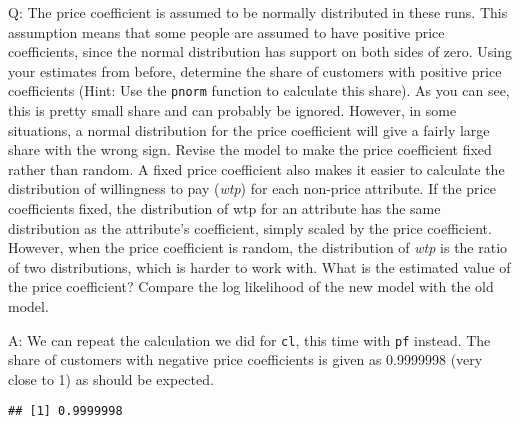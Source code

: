 \documentclass[
]{article}
\newenvironment{Shaded}{\begin{snugshade}}{\end{snugshade}}
\newcommand{\DecValTok}[1]{\textcolor[rgb]{0.00,0.00,0.81}{#1}}
\newcommand{\KeywordTok}[1]{\textcolor[rgb]{0.13,0.29,0.53}{\textbf{#1}}}
\newcommand{\NormalTok}[1]{#1}
\newcommand{\OperatorTok}[1]{\textcolor[rgb]{0.81,0.36,0.00}{\textbf{#1}}}
\newcommand{\StringTok}[1]{\textcolor[rgb]{0.31,0.60,0.02}{#1}}
\begin{document}
Q: The price coefficient is assumed to be normally distributed in these
runs. This assumption means that some people are assumed to have
positive price coefficients, since the normal distribution has support
on both sides of zero. Using your estimates from before, determine the
share of customers with positive price coefficients (Hint: Use the
\texttt{pnorm} function to calculate this share). As you can see, this
is pretty small share and can probably be ignored. However, in some
situations, a normal distribution for the price coefficient will give a
fairly large share with the wrong sign. Revise the model to make the
price coefficient fixed rather than random. A fixed price coefficient
also makes it easier to calculate the distribution of willingness to pay
(\emph{wtp}) for each non-price attribute. If the price coefficients
fixed, the distribution of wtp for an attribute has the same
distribution as the attribute's coefficient, simply scaled by the price
coefficient. However, when the price coefficient is random, the
distribution of \emph{wtp} is the ratio of two distributions, which is
harder to work with. What is the estimated value of the price
coefficient? Compare the log likelihood of the new model with the old
model.


A: We can repeat the calculation we did for \texttt{cl}, this time with
\texttt{pf} instead. The share of customers with negative price
coefficients is given as 0.9999998 (very close to 1) as should be
expected.

\begin{Shaded}
\end{Shaded}

\begin{verbatim}
## [1] 0.9999998
\end{verbatim}

\begin{Shaded}
\end{Shaded}
\end{document}
